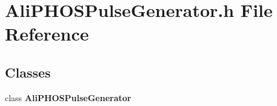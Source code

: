 \section{Ali\-PHOSPulse\-Generator.h File Reference}
\label{AliPHOSPulseGenerator_8h}
\subsection*{Classes}
\begin{CompactItemize}
\item 
class {\bf Ali\-PHOSPulse\-Generator}
\end{CompactItemize}
